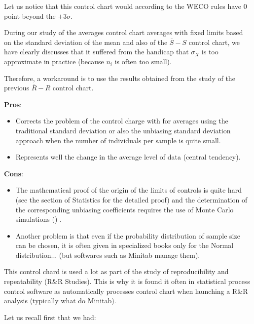 	Let us notice that this control chart would according to the WECO rules have $0$ point beyond the $\pm 3\sigma$.
	
	During our study of the averages control chart averages with fixed limits based on the standard deviation of the mean and also of the $\overline{S}-S$ control chart, we have clearly discusses that it suffered from the handicap that $\sigma_X$ is too approximate in practice (because $n_i$ is often too small).

	Therefore, a workaround is to use the results obtained from the study of the previous $\overline{R}-R$ control chart.
	
	\textbf{Pros}:
	\begin{itemize}
		\item Corrects the problem of the control charge with for averages using the traditional standard deviation or also the unbiasing standard deviation approach when the number of individuals per sample is quite small. 

		\item Represents well the change in the average level of data (central tendency).
	\end{itemize}

	\textbf{Cons}:
	\begin{itemize}
		\item The mathematical proof of the origin of the limits of controls is quite hard (see the section of Statistics for the detailed proof) and the determination of the corresponding unbiasing coefficients requires the use of Monte Carlo simulations () . 

		\item Another problem is that even if the probability distribution of sample size can be chosen, it is often given in specialized books only for the Normal distribution... (but softwares such as Minitab manage them).
 	\end{itemize}
 	\begin{tcolorbox}[title=Remark,colframe=black,arc=10pt]
	This control chard is used a lot as part of the study of reproducibility and repeatability (R\&R Studies). This is why it is found it often in statistical process control software as automatically processes control chart when launching a R\&R analysis (typically what do Minitab).
	\end{tcolorbox}
	Let us recall first that we had:
	
